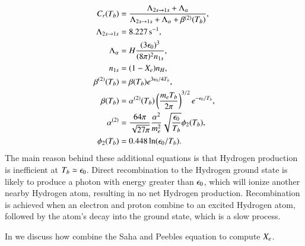 \begin{subequations} \label{eq:M2:theory:peebles:ODE_all_individual_terms}
    \begin{align}
        C_r(T_b) &= \frac{\Lambda_{2s\to1s} + \Lambda_\alpha}{\Lambda_{2s\to1s} + \Lambda_\alpha + \beta^{(2)}(T_b)}, \label{eq:M2:theory:peebles:C_r} \\
        \Lambda_{2s\to1s} &= 8.227\,\mathrm{s^{-1}}, \label{eq:M2:theory:peebles:Lambda_2s_1s} \\
        \Lambda_\alpha &= H \frac{(3\epsilon_0)^3}{(8\pi)^2 n_{1s}}, \label{eq:M2:theory:peebles:Lambda_alpha} \\
        n_{1s} &= (1-X_e) n_H , \label{eq:M2:theory:peebles:n_1s} \\
        \beta^{(2)}(T_b) &= \beta(T_b) e^{3\epsilon_0/4T_b}, \label{eq:M2:theory:peebles:beta2} \\
        \beta(T_b) &= \alpha^{(2)}(T_b) \left( \frac{m_e T_b}{2\pi} \right)^{3/2} e^{-\epsilon_0/T_b}, \label{eq:M2:theory:peebles:beta} \\
        \alpha^{(2)} &= \frac{64\pi}{\sqrt{27\pi}} \frac{\alpha^2}{m_e^2} \sqrt{\frac{\epsilon_0}{T_b}} \phi_2(T_b), \label{eq:M2:theory:peebles:alpha_2} \\
        \phi_2(T_b) &= 0.448\ln(\epsilon_0/T_b). \label{eq:M2:theory:peebles:phi_2} 
    \end{align}
\end{subequations}
The main reason behind these additional equations is that Hydrogen production is inefficient at $T_b\simeq\epsilon_0$. Direct recombination to the Hydrogen ground state is likely to produce a photon with energy greater than $\epsilon_0$, which will ionize another nearby Hydrogen atom, resulting in no net Hydrogen production. Recombination is achieved when an electron and proton combine to an excited Hydrogen atom, followed by the atom's decay into the ground state, which is a slow process.

In  we discuss how combine the Saha and Peebles equation to compute $X_e$.

